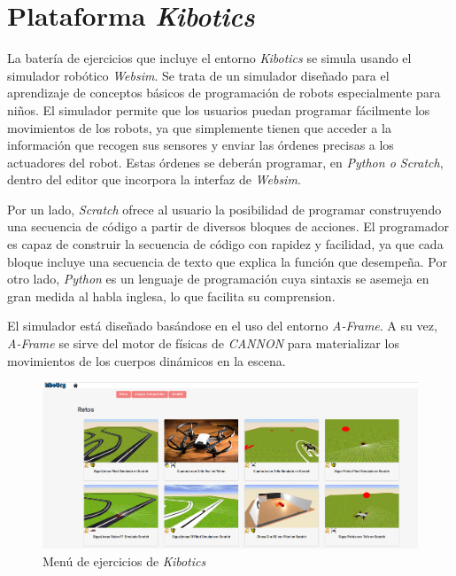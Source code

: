\section{Plataforma \textit{Kibotics}}
La batería de ejercicios que incluye el entorno \textit{Kibotics} se simula usando el simulador robótico \textit{Websim}. Se trata de un simulador diseñado para el aprendizaje de conceptos básicos de programación de robots especialmente para niños. El simulador permite que los usuarios puedan programar fácilmente los movimientos de los robots, ya que simplemente tienen que acceder a la información que recogen sus sensores y enviar las órdenes precisas a los actuadores del robot. Estas órdenes se deberán programar, en\textit{ Python o Scratch}, dentro del editor que incorpora la interfaz de \textit{Websim}. \newline

Por un lado, \textit{Scratch} ofrece al usuario la posibilidad de programar construyendo una secuencia de código a partir de diversos bloques de acciones. El programador es capaz de construir la secuencia de código con rapidez y facilidad, ya que cada bloque incluye una secuencia de texto que explica la función que desempeña. Por otro lado, \textit{Python} es un lenguaje de programación cuya sintaxis se asemeja en gran medida al habla inglesa, lo que facilita su comprension. \newline

El simulador está diseñado basándose en el uso del entorno \textit{A-Frame}. A su vez, \textit{A-Frame} se sirve del motor de físicas de \textit{CANNON} para materializar los movimientos de los cuerpos dinámicos en la escena.

\begin{figure}[h!]
    \centering
    \includegraphics[scale=0.25]{kibotics.png} 
    \caption{Menú de ejercicios de \textit{Kibotics}}
    \label{fig:kibotics}
\end{figure}

